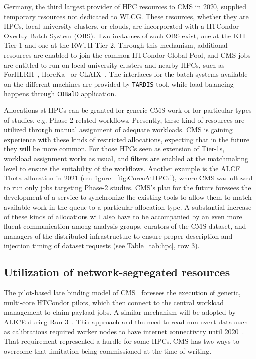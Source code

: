 \documentclass{cmspaper}
\begin{document}
Germany, the third largest provider of HPC resources to CMS in 2020, supplied temporary resources not dedicated to WLCG. These resources, whether they are HPCs, local university clusters, or clouds, are incorporated with a HTCondor Overlay Batch System (OBS). Two instances of such OBS exist, one at the KIT Tier-1 and one at the RWTH Tier-2. Through this mechanism, additional resources are enabled to join the common HTCondor Global Pool, and CMS jobs are entitled to run on local university clusters and nearby HPCs, such as ForHLRII~\cite{forhlr2}, HoreKa~\cite{horeka} or CLAIX~\cite{claix}. The interfaces for the batch systems available on the different machines are provided by \texttt{TARDIS} tool, while load balancing happens through \texttt{COBalD} application.

Allocations at HPCs can be granted for generic CMS work or for particular types of studies, e.g. Phase-2 related workflows. Presently, these kind of resources are utilized through manual assignment of adequate workloads. CMS is gaining experience with these kinds of restricted allocations, expecting that in the future they will be more common. For those HPCs seen as extension of Tier-1s, workload assignment works as usual, and filters are enabled at the matchmaking level to ensure the suitability of the workflows. Another example is the ALCF Theta allocation in 2021 (see figure ~\ref{fig:CoresAtHPCs}), where CMS was allowed to run only jobs targeting Phase-2 studies. CMS's plan for the future foresees the development of a service to synchronize the existing tools to allow them to match available work in the queue to a particular allocation type. A substantial increase of these kinds of allocations will also have to be accompanied by an even more fluent communication among analysis groups, curators of the CMS dataset, and managers of the distributed infrastructure to ensure proper description and injection timing of dataset requests (see Table~\ref{tab:hpc}, row 3).

\subsection{Utilization of network-segregated resources}

The pilot-based late binding model of CMS~\cite{Belforte:2014iba} foresees the execution of generic, multi-core HTCondor pilots, which then connect to the central workload management to claim payload jobs. A similar mechanism will be adopted by ALICE during Run 3~\cite{Buncic:2011297, jalien1, jalien2}. This approach and the need to read non-event data such as calibrations required worker nodes to have internet connectivity until 2020~\cite{Software:2707937,Software:2707936}. That requirement represented a hurdle for some HPCs. CMS has two ways to overcome that limitation being commissioned at the time of writing.
\end{document}
